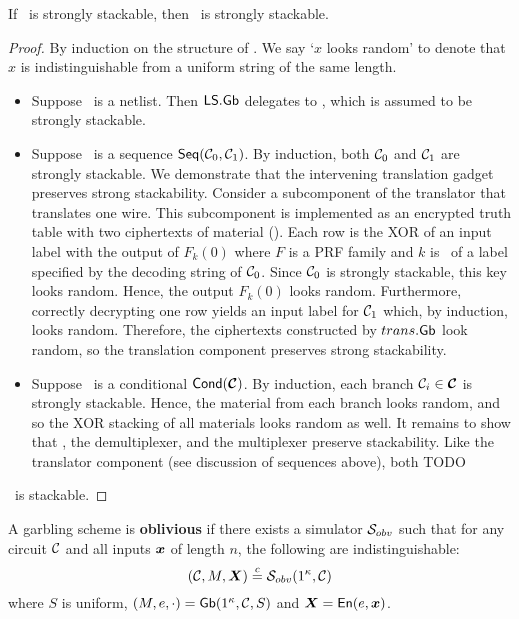 \begin{theorem}\label{thm:strongstack}
  If \underscheme\ is strongly stackable, then \ourscheme\ is strongly stackable.
\end{theorem}
\begin{proof}
  By induction on the structure of \cir.
  We say `$x$ looks random' to denote that $x$ is indistinguishable from a uniform string of the same length.
  \begin{itemize}
    \item Suppose \cir\ is a netlist.
      Then $\textsf{LS}.\textsf{Gb}$ delegates to \underscheme,
      which is assumed to be strongly stackable.
    \item Suppose \cir\ is a sequence $\textsf{Seq}(\mathcal C_0, \mathcal C_1)$.
      By induction,
      both $\mathcal C_0$ and $\mathcal C_1$ are strongly stackable.
      We demonstrate that the intervening translation
      gadget preserves strong stackability.
      Consider a subcomponent of the translator that translates one wire.
      This subcomponent is implemented as an encrypted truth table with two ciphertexts of material ().
      Each row is the XOR of an input label with the
      output of $F_k(0)$ where $F$ is a PRF family and $k$ is \lkey\ of a label specified by the
      decoding string of $\mathcal C_0$.
      Since $\mathcal C_0$ is strongly stackable, this key looks random.
      Hence, the output $F_k(0)$ looks random.
      Furthermore, correctly decrypting one row yields an
      input label for $\mathcal C_1$ which, by induction, looks random.
      Therefore, the ciphertexts constructed by $trans.\textsf{Gb}$
      look random, so the translation component preserves strong stackability.
    \item Suppose \cir\ is a conditional $\conditional(\vec \cir)$.
      By induction, each branch $\cir_i \in \vec \cir$ is strongly
      stackable.
      Hence, the material from each branch looks random, and so the
      XOR stacking of all materials looks random as well.
      It remains to show that \gadget, the demultiplexer, and the multiplexer
      preserve stackability.
      Like the translator component (see discussion of sequences
      above), both TODO
  \end{itemize}
  \ourscheme\ is stackable.
\end{proof}

\begin{definition}[Obliviousness]\label{def:obliviousness}
  A garbling scheme is \textbf{oblivious} if there exists a
  simulator $\mathcal{S}_{obv}$ such that for
  any circuit $\mathcal C$
  and all inputs $\cirinp$ of length $n$,
  the following are indistinguishable:
  \[
    (\cir, \mat, \gcirinp) \indist \simulator_{obv}(1^\kappa, \cir)
  \]
  where
   $S$ is uniform,
   $(M, e, \cdot) = \textsf{Gb}(1^\kappa,\mathcal C,S)$
  and $\gcirinp = \gEn(e,\cirinp)$.
\end{definition}

